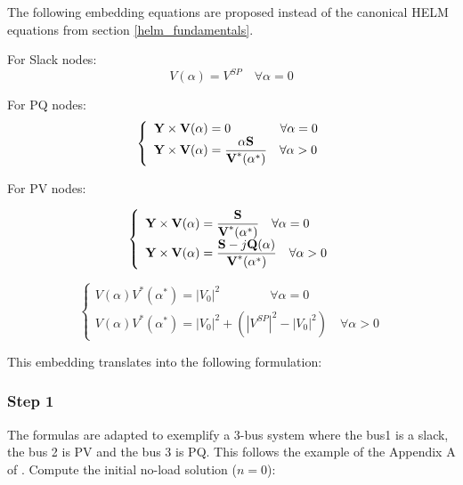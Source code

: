 \documentclass[11pt,fleqn]{book} %
\begin{document}
The following embedding equations are proposed instead of the canonical HELM equations from section \ref{helm_fundamentals}.

For Slack nodes:
\begin{equation}
V(\alpha) = V^{SP} \quad \forall \alpha=0
\end{equation}

For PQ nodes:
\begin{equation}
\left\{
\begin{array}{ll}
\textbf{Y} \times \textbf{V}(\alpha) = 0 \quad \quad \quad \quad \forall \alpha=0\\
\mathlarger{\textbf{Y} \times \textbf{V}(\alpha) = \frac{\alpha \textbf{S}}{\textbf{V}^*(\alpha^*)}} \quad \forall \alpha>0
\end{array}
\right.
\end{equation}

For PV nodes:

\begin{equation}
\left\{
\begin{array}{ll}
\mathlarger{\textbf{Y} \times \textbf{V}(\alpha) = \frac{ \textbf{S}}{\textbf{V}^*(\alpha^*)}} \quad \forall \alpha=0\\
\mathlarger{\textbf{Y} \times \textbf{V}(\alpha) = \frac{ \textbf{S} - j \textbf{Q}(\alpha)}{\textbf{V}^*(\alpha^*)}} \quad \forall \alpha>0
\end{array}
\right.
\end{equation}

\begin{equation}
\left\{
\begin{array}{ll}
V(\alpha)V^*(\alpha^*) = |V_0|^2\quad \quad \quad \quad \forall \alpha=0\\
V(\alpha)V^*(\alpha^*) = |V_0|^2 + (|V^{SP}|^2-|V_0|^2) \quad \forall \alpha>0
\end{array}
\right.
\end{equation}




This embedding translates into the following formulation:

\subsubsection{Step 1}

The formulas are adapted to exemplify a 3-bus system where the bus1 is a slack, the bus 2 is PV and the bus 3 is PQ. This follows the example of the Appendix A of \cite{liu2017online}.
\newline\newline
Compute the initial no-load solution ($n=0$):
\end{document}
